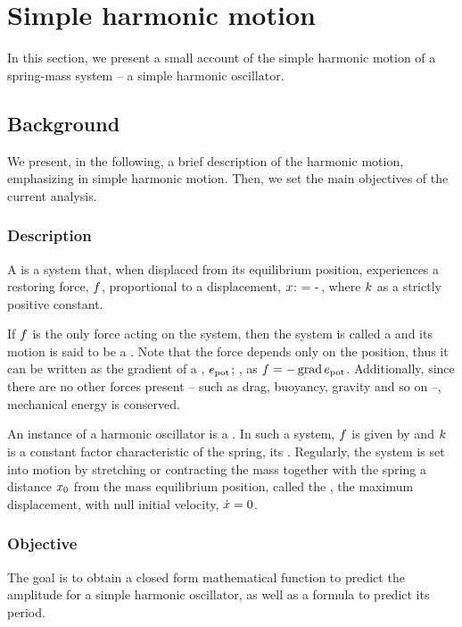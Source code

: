\section{Simple harmonic motion}
In this section, we present a small account of the simple harmonic motion of a spring-mass system -- a simple harmonic oscillator.


\subsection{Background}
We present, in the following, a brief description of the harmonic motion, emphasizing in simple harmonic motion. Then, we set the main objectives of the current analysis.


\subsubsection{Description}
A  is a system that, when displaced from its equilibrium position, experiences a restoring force, $f$, proportional to a displacement, $x$:
\beq
\force = -\kspring\disp\,,
\eeq
where $k$ as a strictly positive constant.

If $f$ is the only force acting on the system, then the system is called a  and its motion is said to be a . Note that the force depends only on the position, thus it can be written as the gradient of a , $e_\text{pot}$; \ie, as $f = -\operatorname{grad}e_\text{pot}$. Additionally, since there are no other forces present -- such as drag, buoyancy, gravity and so on --, mechanical energy is conserved.

An instance of a harmonic oscillator is a . In such a system, $f$ is given by  and $k$ is a constant factor characteristic of the spring, its . Regularly, the system is set into motion by stretching or contracting the mass together with the spring a distance $x_0$ from the mass equilibrium position, called the , the maximum displacement, with null initial velocity, $\dot{x} = 0$.


\subsubsection{Objective}
The goal is to obtain a closed form mathematical function to predict the amplitude for a simple harmonic oscillator, as well as a formula to predict its period.


